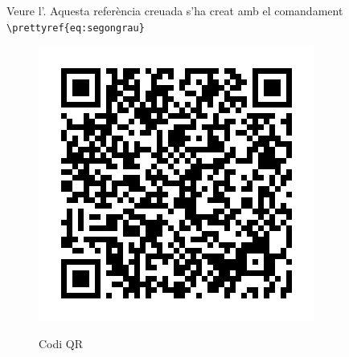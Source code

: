 \documentclass[fontsize=11pt,%
               paper=a4,%
               captions=tableheading,%
               numbers=noenddot,%
               parskip=full,%
               ]{scrartcl}
\begin{document}
\begin{tcolorbox}[%
skin=beamer,      
width=\linewidth-2cm,         %
fonttitle=\sffamily\bfseries, %
coltitle=black,               %
colframe=yellow!50!red,       %
colback=white,                %
title=Referència a equació]     %
Veure l'. Aquesta referència creuada s'ha creat amb el comandament \verb+\prettyref{eq:segongrau}+
\end{tcolorbox}

\lipsum[2-4]

\begin{figure}[ht]
 \centering
 \includegraphics[scale=0.5,keepaspectratio=true]{./qrplanet.png}
 \label{fig:qrcode}
 \caption{Codi QR}
\end{figure}
\end{document}
